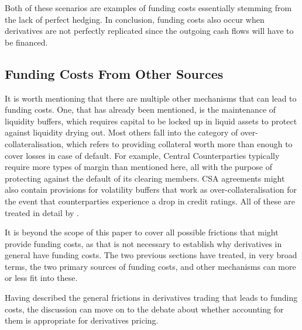 \documentclass[main.tex]{subfiles}
\begin{document}
        Both of these scenarios are examples of funding costs essentially stemming from the lack of perfect hedging.
        In conclusion, funding costs also occur when derivatives are not perfectly replicated
        since the outgoing cash flows will have to be financed.

    \subsection{Funding Costs From Other Sources}
        It is worth mentioning that there are multiple other mechanisms 
        that can lead to funding costs.
        One, that has already been mentioned, is the maintenance of liquidity buffers,
        which requires capital to be locked up in liquid assets
        to protect against liquidity drying out.
        Most others fall into the category of over-collateralisation,
        which refers to providing collateral 
        worth more than enough to cover losses in case of default.
        For example, 
        Central Counterparties typically require more types of margin than mentioned here,
        all with the purpose of protecting against the default of its clearing members.
        CSA agreements might also contain provisions for volatility buffers
        that work as over-collateralisation 
        for the event that counterparties experience a drop in credit ratings.
        All of these are treated in detail by \textcite[Chapter 10]{Green2015XVA}.

        It is beyond the scope of this paper to cover all possible frictions 
        that might provide funding costs, 
        as that is not necessary to establish why derivatives in general have funding costs.
        The two previous sections have treated, in very broad terms, 
        the two primary sources of funding costs, 
        and other mechanisms can more or less fit into these.

        Having described the general frictions in derivatives trading that leads to funding costs,
        the discussion can move on to the debate about 
        whether accounting for them is appropriate for derivatives pricing.
\end{document}
